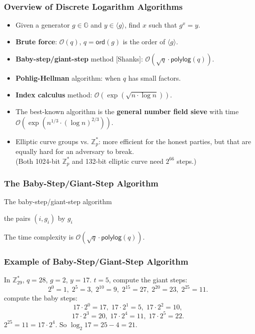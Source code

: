 \begin{frame}\frametitle{Overview of Discrete Logarithm Algorithms}
\begin{itemize}
\item Given a generator $g \in \mathbb{G}$ and $y \in \langle g \rangle$, find $x$ such that $g^x=y$.
\item \textbf{Brute force}: $\mathcal{O}(q)$, $q = \mathsf{ord}(g)$ is the order of $\langle g\rangle$.
\item \textbf{Baby-step/giant-step} method [Shanks]: $\mathcal{O}(\sqrt{q}\cdot \mathsf{polylog}(q))$.
\item \textbf{Pohlig-Hellman} algorithm: when $q$ has small factors.
\item \textbf{Index calculus} method: $\mathcal{O}(\exp{(\sqrt{n\cdot \log n})})$.
\item The best-known algorithm is the \textbf{general number field sieve} with time $\mathcal{O}(\exp(n^{1/3}\cdot(\log n)^{2/3}))$.
\item Elliptic curve groups vs. $\mathbb{Z}_p^*$: more efficient for the honest parties, but that are equally hard for an adversary to break.\\ (Both 1024-bit $\mathbb{Z}_p^*$ and 132-bit elliptic curve need $2^{66}$ steps.)
\end{itemize}
\end{frame}
\begin{frame}\frametitle{The Baby-Step/Giant-Step Algorithm}
\begin{figure}
\begin{center}

\end{center}
\end{figure}
\begin{algorithm}[H]
\DontPrintSemicolon
\caption{The baby-step/giant-step algorithm}
\BlankLine

\; 
\KwS the pairs $(i,g_i)$ by $g_i$\;
\end{algorithm}
The time complexity is $\mathcal{O}(\sqrt{q}\cdot \mathsf{polylog}(q))$.
\end{frame}
\begin{frame}\frametitle{Example of Baby-Step/Giant-Step Algorithm}
\begin{exampleblock}{In $\mathbb{Z}^*_{29}$, $q=28$, $g=2$, $y=17$.}
$t=5$, compute the giant steps:
\[2^0=1,\; 2^5=3,\; 2^{10}=9,\; 2^{15}=27,\; 2^{20}=23,\; 2^{25}=11. \]
compute the baby steps:
\[17\cdot 2^0=17,\; 17\cdot 2^1=5,\; 17\cdot 2^2=10,\]
\[ 17\cdot 2^3=20,\; 17\cdot 2^4=11,\; 17\cdot 2^5=22.\]
$2^{25}=11=17\cdot 2^4$. So $\log_2 17=25-4=21$.
\end{exampleblock}

\end{frame}
